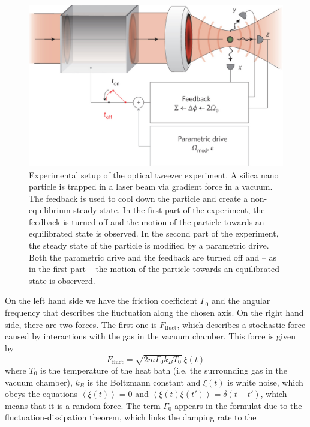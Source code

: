 \documentclass[12pt]{article}
\begin{document}
\begin{figure}[H]
    \begin{center}
        \includegraphics[scale=0.3]{images/experimental_setup.jpg}
        \caption{Experimental setup of the optical tweezer experiment. A silica nano particle is trapped in a laser beam via gradient force in a
        vacuum. The feedback is used to cool down the particle and create a non-equilibrium steady state. In the first part of the experiment, the
    feedback is turned off and the motion of the particle towards an equilibrated state is observed. In the second part of the experiment, the steady state
of the particle is modified by a parametric drive. Both the parametric drive and the feedback are turned off and -- as in the first part -- the
motion of the particle towards an equilibrated state is observerd.}
        \label{fig:setup}
    \end{center}
\end{figure}
On the left hand side we have the friction coefficient $\Gamma_0$ and the angular frequency that describes the fluctuation along the chosen axis. On
the right hand side, there are two forces. The first one is $F_\text{fluct}$, which describes a stochastic force caused by interactions with the gas
in the vacuum chamber. This force is given by
\begin{equation}
    F_\text{fluct} = \sqrt{2m\Gamma_0k_BT_0} \ \xi\left(t\right)
\end{equation}
where $T_0$ is the temperature of the heat bath (i.e. the surrounding gas in the vacuum chamber), $k_B$ is the Boltzmann constant and $\xi(t)$ is
white noise, which obeys the equations $\left\langle\xi(t)\right\rangle= 0$ and $\left\langle\xi(t)\xi(t')\right\rangle= \delta(t-t')$, which means
that it is a random force. The term $\Gamma_0$ appears in the formulat due to the fluctuation-dissipation theorem, which links the damping rate to the
\end{document}
